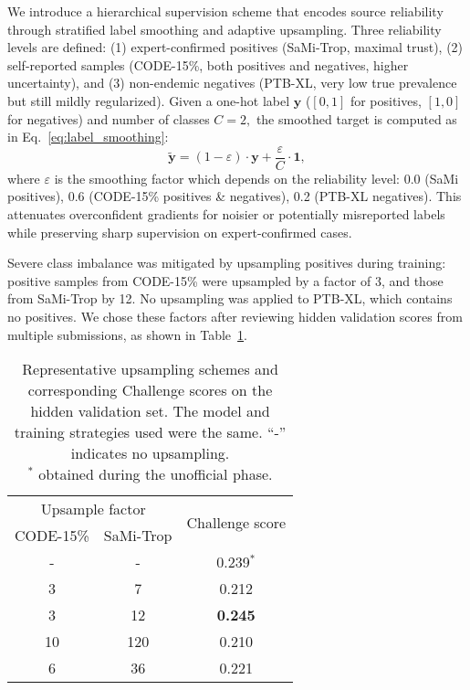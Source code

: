 \documentclass[twocolumn]{cinc}
\begin{document}
We introduce a hierarchical supervision scheme that encodes source reliability through stratified label smoothing and adaptive upsampling. Three reliability levels are defined: (1) expert-confirmed positives (SaMi-Trop, maximal trust), (2) self-reported samples (CODE-15\%, both positives and negatives, higher uncertainty), and (3) non-endemic negatives (PTB-XL, very low true prevalence but still mildly regularized). Given a one-hot label $\mathbf{y}$ ($[0, 1]$ for positives, $[1, 0]$ for negatives) and number of classes $C = 2,$ the smoothed target is computed as in Eq.~\ref{eq:label_smoothing}:
\begin{equation}
\label{eq:label_smoothing}
\tilde{\mathbf{y}} = (1 - \varepsilon) \cdot \mathbf{y} + \frac{\varepsilon}{C} \cdot \mathbf{1},
\end{equation}
where $\varepsilon$ is the smoothing factor which depends on the reliability level: 0.0 (SaMi positives), 0.6 (CODE-15\% positives \& negatives), 0.2 (PTB-XL negatives). This attenuates overconfident gradients for noisier or potentially misreported labels while preserving sharp supervision on expert-confirmed cases.

Severe class imbalance was mitigated by upsampling positives during training: positive samples from CODE-15\% were upsampled by a factor of 3, and those from SaMi-Trop by 12. No upsampling was applied to PTB-XL, which contains no positives. We chose these factors after reviewing hidden validation scores from multiple submissions, as shown in Table~\ref{tab:upsampling_schemes}.


\begin{table}[!htbp]
\centering
\begin{tabular}{ccc}
\toprule
\multicolumn{2}{c}{Upsample factor} & \multirow{2}{*}{Challenge score} \\
\cmidrule(lr){1-2}
CODE-15\% &  SaMi-Trop & \\
\midrule
- & -     & 0.239$^*$ \\
3 & 7      & 0.212 \\
3 & 12    & \textbf{0.245} \\
10 & 120   & 0.210 \\
6 & 36     & 0.221 \\
\bottomrule
\end{tabular}
\caption{Representative upsampling schemes and corresponding Challenge scores on the hidden validation set. The model and training strategies used were the same. “-” indicates no upsampling.\\
$^*$ obtained during the unofficial phase.
}
\label{tab:upsampling_schemes}
\end{table}
\end{document}
